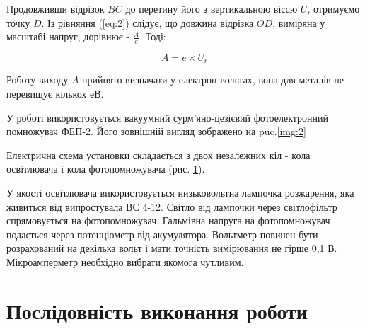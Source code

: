 \documentclass[twocolumn]{el-author}
\begin{document}
\begin{figure}[h]
\caption{\source{}}
\label{img:3}
\end{figure}

Продовживши відрізок $BC$ до перетину його з вертикальною віссю $U$,
отримуємо точку $D$. Із рівняння (\ref{eq:2}) слідує, що довжина відрізка $OD$, виміряна у масштабі напруг, дорівнює - $\frac{A}{e}$. Тоді:

\begin{equation} \label{eq:3}
A = e \times U_{r}
\end{equation}

Роботу виходу $A$ прийнято визначати у електрон-вольтах, вона для металів не перевищує кількох $еВ$.

У роботі використовується вакуумний сурм'яно-цезієвий фотоелектронний помножувач ФЕП-2. Його зовнішній вигляд зображено на puc.\ref{img:2}

Електрична схема установки складається з двох незалежних кіл - кола
освітлювача і кола фотопомножувача (рис. \ref{img:3}).

У якості освітлювача використовується низьковольтна лампочка
розжарення, яка живиться від випростувала ВС 4-12. Світло від лампочки
через світлофільтр спрямовується на фотопомножувач. Гальмівна напруга на
фотопомножувач подається через потенціометр від акумулятора. Вольтметр
повинен бути розрахований на декілька вольт і мати точність вимірювання не
гірше 0,1 В. Мікроамперметр необхідно вибрати якомога чутливим.

\section{Послідовність виконання роботи}
\end{document}
